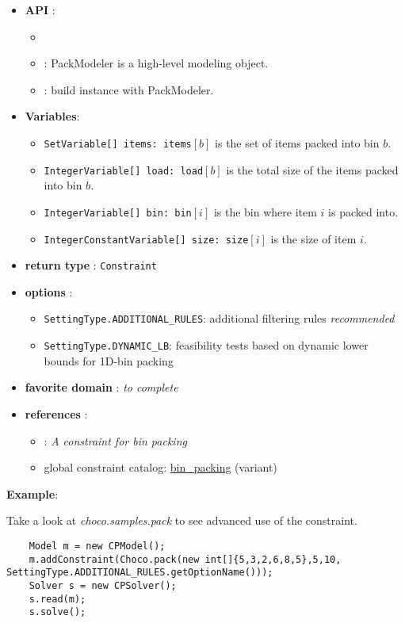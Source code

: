 \begin{itemize}
	\item \textbf{API} :
	\begin{itemize}
		\item {}
		\item {}: PackModeler is a high-level modeling object.
		\item {}: build instance with PackModeler.
	\end{itemize}
	\item \textbf{Variables}:
	\begin{itemize}
		\item \texttt{SetVariable[] items: items}$[b]$ is the set of items packed into bin $b$.
		\item \texttt{IntegerVariable[] load: load}$[b]$ is the total size of the items packed into bin $b$.
		\item \texttt{IntegerVariable[] bin: bin}$[i]$ is the bin where item $i$ is packed into.
		\item \texttt{IntegerConstantVariable[] size: size}$[i]$ is the size of item $i$.
	\end{itemize}
	\item \textbf{return type} : \texttt{Constraint}
	\item \textbf{options} : 	
      \begin{itemize}
      \item \texttt{SettingType.ADDITIONAL\_RULES}: additional filtering rules \emph{recommended}
      \item \texttt{SettingType.DYNAMIC\_LB}: feasibility tests based on dynamic lower bounds for 1D-bin packing
      \end{itemize}
	\item \textbf{favorite domain} : \emph{to complete}
	\item \textbf{references} :
      \begin{itemize}
      \item \cite{ShawCP04}: \emph{A constraint for bin packing}
      \item global constraint catalog: \href{http://www.emn.fr/x-info/sdemasse/gccat/Cbin_packing.html}{bin\_packing} (variant)
      \end{itemize}
\end{itemize}

\textbf{Example}:

Take a look at \emph{choco.samples.pack} to see advanced use of the constraint.
\begin{lstlisting}
	Model m = new CPModel();
	m.addConstraint(Choco.pack(new int[]{5,3,2,6,8,5},5,10, SettingType.ADDITIONAL_RULES.getOptionName()));
	Solver s = new CPSolver();
	s.read(m);
	s.solve();
\end{lstlisting} 

